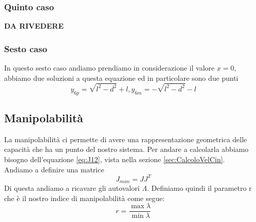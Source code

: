 \subsubsection{Quinto caso}
\textbf{DA RIVEDERE}
\subsubsection{Sesto caso}
In questo sesto caso andiamo prendiamo in considerazione il valore $x=0$, abbiamo due soluzioni a questa equazione ed in particolare sono due punti
\begin{equation}
    y_{6p} = \sqrt{l^2-d^2}+l , y_{6m} = -\sqrt{l^2-d^2}-l
\end{equation}
\subsection{Manipolabilità}
La manipolabilità ci permette di avere una rappresentazione geometrica delle capacità che ha un punto del nostro sistema. Per andare a calcolarla abbiamo bisogno dell'equazione \ref{eq:J12}, vista nella sezione \ref{sec:CalcoloVelCin}.
\\Andiamo a definire una matrice
\begin{equation*}
    J_{man} = JJ^T
\end{equation*}
Di questa andiamo a ricavare gli autovalori $\Lambda$. Definiamo quindi il parametro r che è il nostro indice di manipolabilità come segue:
\begin{equation}
    r = \frac{\max\lambda}{\min\lambda}
\end{equation}
